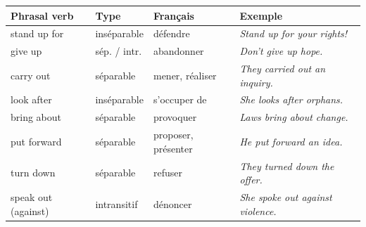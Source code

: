 \documentclass[11pt]{article}
\newcommand{\eng}[1]{\ifmmode\text{\textit{#1}}\else\begingroup\selectlanguage{english}\itshape #1\endgroup\fi}
\begin{document}
\begin{center}
\begin{tabularx}{\linewidth}{|l|l|X|X|}
\hline
\rowcolor{popblueL} Phrasal verb & Type & Français & Exemple \\
\hline
stand up for & inséparable & défendre & \eng{Stand up for your rights!} \\
\hline
give up & sép. / intr. & abandonner & \eng{Don't give up hope.} \\
\hline
carry out & séparable & mener, réaliser & \eng{They carried out an inquiry.} \\
\hline
look after & inséparable & s'occuper de & \eng{She looks after orphans.} \\
\hline
bring about & séparable & provoquer & \eng{Laws bring about change.} \\
\hline
put forward & séparable & proposer, présenter & \eng{He put forward an idea.} \\
\hline
turn down & séparable & refuser & \eng{They turned down the offer.} \\
\hline
speak out (against) & intransitif & dénoncer & \eng{She spoke out against violence.} \\
\hline
\end{tabularx}
\end{center}
\end{document}
